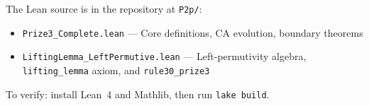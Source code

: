 \documentclass[11pt]{article}
\theoremstyle{plain}
\theoremstyle{definition}
\begin{document}
The Lean source is in the repository at \texttt{P2p/}:
\begin{itemize}
  \item \texttt{Prize3\_Complete.lean} --- Core definitions, CA evolution, boundary theorems
  \item \texttt{LiftingLemma\_LeftPermutive.lean} --- Left-permutivity algebra,
    \texttt{lifting\_lemma} axiom, and \texttt{rule30\_prize3}
\end{itemize}

To verify: install Lean~4 and Mathlib, then run \texttt{lake build}.
\end{document}
